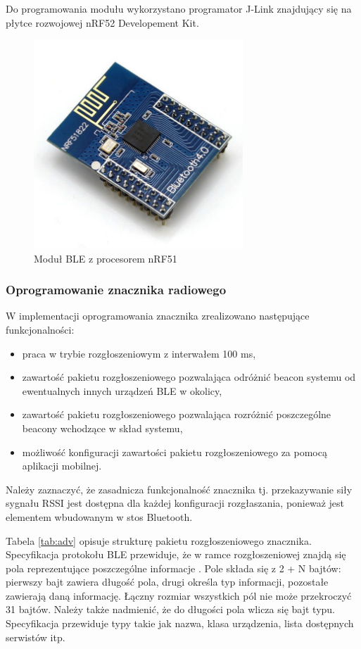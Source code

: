 Do programowania modułu wykorzystano programator J-Link znajdujący się na płytce rozwojowej nRF52 Developement Kit. 
\begin{figure}
\centering
\includegraphics[width=0.7\textwidth]{img/board.jpg}
\caption{Moduł BLE z procesorem nRF51}
\label{fig:plytka}
\end{figure}

\subsubsection{Oprogramowanie znacznika radiowego}
W implementacji oprogramowania znacznika zrealizowano następujące funkcjonalności:
\begin{itemize}
 \item praca w trybie rozgłoszeniowym z interwałem 100 ms,
 \item zawartość pakietu rozgłoszeniowego pozwalająca odróżnić beacon systemu od ewentualnych innych urządzeń BLE w okolicy,
 \item zawartość pakietu rozgłoszeniowego pozwalająca rozróżnić poszczególne beacony wchodzące w skład systemu,
 \item możliwość konfiguracji zawartości pakietu rozgłoszeniowego za pomocą aplikacji mobilnej.
\end{itemize}

Należy zaznaczyć, że zasadnicza funkcjonalność znacznika tj. przekazywanie siły sygnału RSSI jest dostępna dla każdej konfiguracji rozgłaszania, ponieważ jest elementem wbudowanym w stos Bluetooth.

Tabela \ref{tab:adv} opisuje strukturę pakietu rozgłoszeniowego znacznika. Specyfikacja protokołu BLE przewiduje, że w ramce rozgłoszeniowej znajdą się pola reprezentujące poszczególne informacje \cite{ble}. Pole składa się z 2 + N bajtów: pierwszy bajt zawiera długość pola, drugi określa typ informacji, pozostałe zawierają daną informację. Łączny rozmiar wszystkich pól nie może przekroczyć 31 bajtów. Należy także nadmienić, że do długości pola wlicza się bajt typu. Specyfikacja przewiduje typy takie jak nazwa, klasa urządzenia, lista dostępnych serwistów itp.


